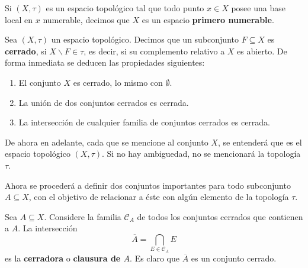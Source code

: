 \documentclass[12pt]{report}
\theoremstyle{largebreak}
\renewcommand{\theenumi}{\arabic{enumi})}
\begin{document}
    \begin{mydef}
        Si $(X,\tau)$ es un espacio topológico tal que todo punto $x\in X$ posee una base local en $x$ numerable, decimos que $X$ es un espacio \textbf{primero numerable}. 
    \end{mydef}

    \begin{mydef}
        Sea $(X,\tau)$ un espacio topológico. Decimos que un subconjunto $F\subseteq X$ es \textbf{cerrado}, si $X\backslash F\in \tau$, es decir, si su complemento relativo a $X$ es abierto. De forma inmediata se deducen las propiedades siguientes:
        \renewcommand{\theenumi}{C\arabic{enumi})}
        \begin{enumerate}
            \item El conjunto $X$ es cerrado, lo mismo con $\emptyset$.
            \item La unión de dos conjuntos cerrados es cerrada.
            \item La intersección de cualquier familia de conjuntos cerrados es cerrada.
        \end{enumerate}
        \renewcommand{\theenumi}{B\arabic{enumi})}
    \end{mydef}

    De ahora en adelante, cada que se mencione al conjunto $X$, se entenderá que es el espacio topológico $(X,\tau)$. Si no hay ambiguedad, no se mencionará la topología $\tau$.

    Ahora se procederá a definir dos conjuntos importantes para todo subconjunto $A\subseteq X$, con el objetivo de relacionar a éste con algún elemento de la topología $\tau$.

    \begin{mydef}
        Sea $A\subseteq X$. Considere la familia $\mathcal{C}_A$ de todos los conjuntos cerrados que contienen a $A$. La intersección
        \begin{equation*}
            \overline{A}=\bigcap_{E\in\mathcal{C}_A}E
        \end{equation*}
        es la \textbf{cerradora} o \textbf{clausura de $A$}. Es claro que $\overline{A}$ es un conjunto cerrado.
    \end{mydef}
\end{document}
